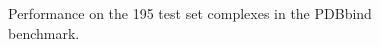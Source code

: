 \begin{figure}
{}
\caption{Performance on the 195 test set complexes in the PDBbind benchmark.}
\label{rfscore3:partition1stat}
\end{figure}

